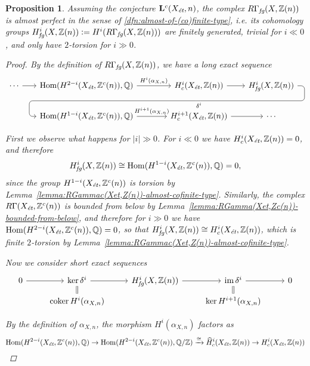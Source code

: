 \documentclass{article}
\DeclareMathOperator{\coker}{coker}
\DeclareMathOperator{\Hom}{Hom}
\DeclareMathOperator{\im}{im}
\newcommand{\QQ}{\mathbb{Q}}
\newcommand{\ZZ}{\mathbb{Z}}
\newcommand{\et}{\text{\it ét}}
\newcommand{\fg}{\text{\it fg}}
\newcommand{\dfn}{\mathrel{\mathop:}=}
\newtheorem{proposition}[theorem]{Proposition}
\theoremstyle{definition}
\numberwithin{equation}{section}
\begin{document}
\begin{proposition}
  \label{prop:RGammafg-almost-perfect}
  Assuming the conjecture $\mathbf{L}^c (X_\et, n)$,
  the complex $R\Gamma_\fg (X, \ZZ (n))$ is almost perfect in the
  sense of \ref{dfn:almost-of-(co)finite-type}, i.e. its cohomology groups
  $H^i_\fg (X, \ZZ (n)) \dfn H^i (R\Gamma_\fg (X, \ZZ (n)))$
  are finitely generated, trivial for $i \ll 0$, and only have $2$-torsion for
  $i \gg 0$.

  \begin{proof}
    By the definition of $R\Gamma_\fg (X, \ZZ (n))$, we have a long exact
    sequence
    \[ \begin{tikzcd}[column sep=1.75em]
      \cdots\ar{r} & \Hom (H^{2-i} (X_\et, \ZZ^c (n)), \QQ) \ar{r}{H^i (\alpha_{X,n})} &[2em] H^i_c (X_\et, \ZZ (n))\ar{r}\ar[draw=none]{d}[name=X, anchor=center]{} & H^i_\fg (X, \ZZ (n)) \ar[rounded corners,to path={ -- ([xshift=2ex]\tikztostart.east) |- (X.center) \tikztonodes -| ([xshift=-2ex]\tikztotarget.west) -- (\tikztotarget)}]{dll}[at end]{\delta^i} \\
      & \Hom (H^{1-i} (X_\et, \ZZ^c (n)), \QQ)\ar{r}{H^{i+1} (\alpha_{X,n})} & H^{i+1}_c (X_\et, \ZZ (n))\ar{r} & \cdots
    \end{tikzcd} \]

    First we observe what happens for $|i| \gg 0$.
    For $i \ll 0$ we have $H^i_c (X_\et, \ZZ (n)) = 0$, and therefore
    $$H^i_\fg (X, \ZZ (n)) \cong \Hom (H^{1-i} (X_\et, \ZZ^c (n)), \QQ) = 0,$$
    since the group $H^{1-i} (X_\et, \ZZ^c (n))$ is torsion by
    Lemma~\ref{lemma:RGammac(Xet,Z(n))-almost-cofinite-type}.
    Similarly, the complex $R\Gamma (X_\et, \ZZ^c (n))$ is bounded from below by
    Lemma~\ref{lemma:RGamma(Xet,Zc(n))-bounded-from-below}, and therefore
    for $i \gg 0$ we have
    $\Hom (H^{2-i} (X_\et, \ZZ^c (n)), \QQ) = 0$, so that
    $H^i_\fg (X, \ZZ (n)) \cong H^i_c (X_\et, \ZZ (n))$, which is finite
    $2$-torsion by Lemma~\ref{lemma:RGammac(Xet,Z(n))-almost-cofinite-type}.

    Now we consider short exact sequences
    \[ \begin{tikzcd}[row sep=0.5em]
      0 \ar{r} & \ker \delta^i \ar{r}\ar[equals]{d} & H^i_\fg (X, \ZZ (n)) \ar{r} & \im \delta^i \ar{r}\ar[equals]{d} & 0\\
      & \coker H^i (\alpha_{X,n}) & & \ker H^{i+1} (\alpha_{X,n})
    \end{tikzcd} \]

    By the definition of $\alpha_{X,n}$, the morphism $H^i (\alpha_{X,n})$ factors as
    \[ \Hom (H^{2-i} (X_\et, \ZZ^c (n)), \QQ) \to
    \Hom (H^{2-i} (X_\et, \ZZ^c (n)), \QQ/\ZZ) \xrightarrow{\cong}
    \widehat{H}^i_c (X_\et, \ZZ (n)) \to H^i_c (X_\et, \ZZ (n)) \]


\end{proof}
\end{proposition}
\end{document}
